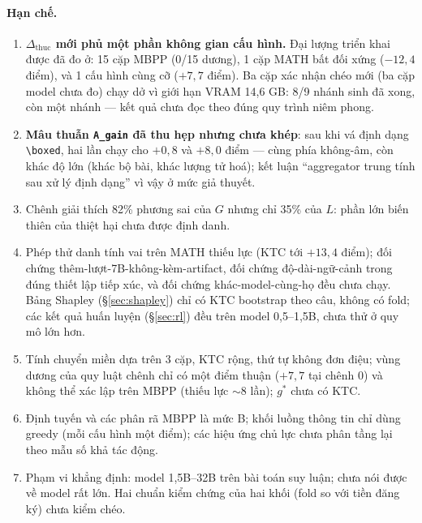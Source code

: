 \documentclass[12pt,a4paper]{article}
\newcommand{\dhonest}{\Delta_{\mathrm{thuc}}}
\begin{document}
\paragraph{Hạn chế.}
\begin{enumerate}\itemsep2pt
\item \textbf{$\dhonest$ mới phủ một phần không gian cấu hình.} Đại lượng triển khai được đã đo
      ở: 15 cặp MBPP (0/15 dương), 1 cặp MATH bất đối xứng ($-12{,}4$ điểm), và 1 cấu hình cùng
      cỡ ($+7{,}7$ điểm). Ba cặp xác nhận chéo mới (ba cặp model chưa đo) chạy dở vì giới hạn VRAM
      14,6 GB: 8/9 nhánh sinh đã xong, còn một nhánh --- kết quả chưa đọc theo đúng quy trình
      niêm phong.
\item \textbf{Mâu thuẫn \texttt{A\_gain} đã thu hẹp nhưng chưa khép}: sau khi vá định dạng
      \verb|\boxed|, hai lần chạy cho $+0{,}8$ và $+8{,}0$ điểm --- cùng phía không-âm, còn
      khác độ lớn (khác bộ bài, khác lượng tử hoá); kết luận ``aggregator trung tính sau xử lý
      định dạng'' vì vậy ở mức giả thuyết.
\item Chênh giải thích 82\% phương sai của $G$ nhưng chỉ 35\% của $L$: phần lớn biến thiên của
      thiệt hại chưa được định danh.
\item Phép thử danh tính vai trên MATH thiếu lực (KTC tới $+13{,}4$ điểm); đối chứng
      thêm-lượt-7B-không-kèm-artifact, đối chứng độ-dài-ngữ-cảnh trong đúng thiết lập tiếp
      xúc, và đối chứng khác-model-cùng-họ đều chưa chạy. Bảng Shapley
      (\S\ref{sec:shapley}) chỉ có KTC bootstrap theo câu, không có fold; các kết quả huấn
      luyện (\S\ref{sec:rl}) đều trên model 0,5--1,5B, chưa thử ở quy mô lớn hơn.
\item Tính chuyển miền dựa trên 3 cặp, KTC rộng, thứ tự không đơn điệu; vùng dương của quy
      luật chênh chỉ có một điểm thuận ($+7{,}7$ tại chênh 0) và không thể xác lập trên MBPP
      (thiếu lực $\sim$8 lần); $g^\ast$ chưa có KTC.
\item Định tuyến và các phân rã MBPP là mức B; khối luồng thông tin chỉ dùng greedy (mỗi cấu
      hình một điểm); các hiệu ứng chủ lực chưa phân tầng lại theo mẫu số khả tác động.
\item Phạm vi khẳng định: model 1,5B--32B trên bài toán suy luận; chưa nói được về model rất
      lớn. Hai chuẩn kiểm chứng của hai khối (fold so với tiền đăng ký) chưa kiểm chéo.
\end{enumerate}
\end{document}
